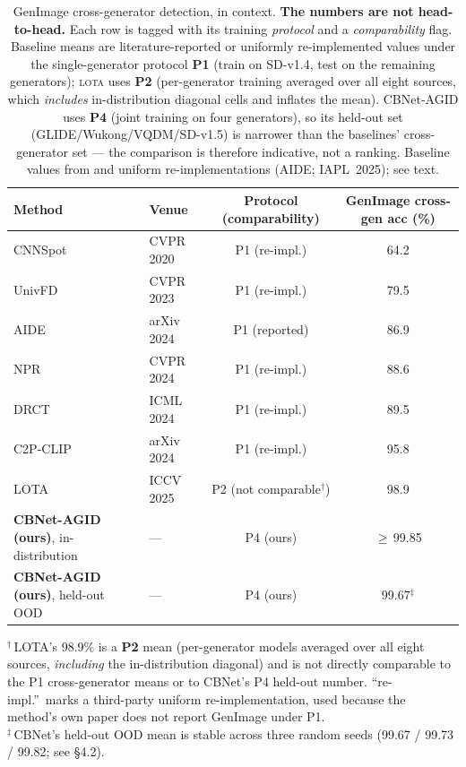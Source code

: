 \begin{table}[t]
  \centering
  \caption{GenImage cross-generator detection, in context. \textbf{The numbers are not head-to-head.}
  Each row is tagged with its training \emph{protocol} and a \emph{comparability} flag. Baseline means are
  literature-reported or uniformly re-implemented values under the single-generator protocol \textbf{P1}
  (train on SD-v1.4, test on the remaining generators); \textsc{lota} uses \textbf{P2} (per-generator training
  averaged over all eight sources, which \emph{includes} in-distribution diagonal cells and inflates the mean).
  CBNet-AGID uses \textbf{P4} (joint training on four generators), so its held-out set
  (GLIDE/Wukong/VQDM/SD-v1.5) is narrower than the baselines' cross-generator set --- the comparison is
  therefore indicative, not a ranking. Baseline values from \citet{zhu2023genimage} and uniform
  re-implementations (AIDE; IAPL~2025); see text.}
  \label{tab:baselines}
  \small
  \begin{tabular}{llcc}
    \toprule
    Method & Venue & Protocol (comparability) & GenImage cross-gen acc (\%) \\
    \midrule
    CNNSpot \citep{wang2020cnngenerated} & CVPR 2020 & P1 (re-impl.) & 64.2 \\
    UnivFD \citep{ojha2023universal}     & CVPR 2023 & P1 (re-impl.) & 79.5 \\
    AIDE \citep{yan2024aide}             & arXiv 2024 & P1 (reported) & 86.9 \\
    NPR \citep{tan2024npr}               & CVPR 2024  & P1 (re-impl.) & 88.6 \\
    DRCT \citep{chen2024drct}            & ICML 2024  & P1 (re-impl.) & 89.5 \\
    C2P-CLIP \citep{tan2024c2pclip}      & arXiv 2024 & P1 (re-impl.) & 95.8 \\
    LOTA \citep{wang2025lota}            & ICCV 2025 & P2 (not comparable$^{\dagger}$) & 98.9 \\
    \midrule
    \textbf{CBNet-AGID (ours)}, in-distribution & --- & P4 (ours) & $\geq$\,99.85 \\
    \textbf{CBNet-AGID (ours)}, held-out OOD     & --- & P4 (ours) & 99.67$^{\ddagger}$ \\
    \bottomrule
  \end{tabular}

  \vspace{3pt}
  {\footnotesize $^{\dagger}$\,LOTA's 98.9\% is a \textbf{P2} mean (per-generator models averaged over all eight
  sources, \emph{including} the in-distribution diagonal) and is not directly comparable to the P1 cross-generator
  means or to CBNet's P4 held-out number. ``re-impl.''\ marks a third-party uniform re-implementation, used
  because the method's own paper does not report GenImage under P1.\\
  $^{\ddagger}$\,CBNet's held-out OOD mean is stable across three random seeds
  (99.67 / 99.73 / 99.82; see \S{}4.2).}
\end{table}
